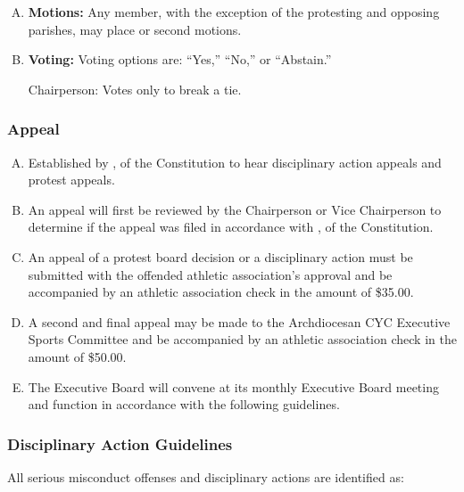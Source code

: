 \begin{enumerate}[A.]
    \item \textbf{Motions:} Any member, with the exception of the protesting and opposing parishes, may place or second motions.
    \item \textbf{Voting:} Voting options are: ``Yes,'' ``No,'' or ``Abstain.''

    Chairperson:  Votes only to break a tie.
 \end{enumerate}

\subsubsection{Appeal}
\begin{enumerate}[A.]
    \item Established by ,  of the Constitution to hear disciplinary action appeals and protest appeals.
    \item An appeal will first be reviewed by the Chairperson or Vice Chairperson to determine if the appeal was filed in accordance with ,  of the Constitution.
    \item An appeal of a protest board decision or a disciplinary action must be submitted with the offended athletic association’s approval and be accompanied by an athletic association check in the amount of \$35.00.
    \item A second and final appeal may be made to the Archdiocesan CYC Executive Sports Committee and be accompanied by an athletic association check in the amount of \$50.00.
    \item The Executive Board will convene at its monthly Executive Board meeting and function in accordance with the following guidelines.
\end{enumerate}

\subsubsection{Disciplinary Action Guidelines}
All serious misconduct offenses and disciplinary actions are identified as:


